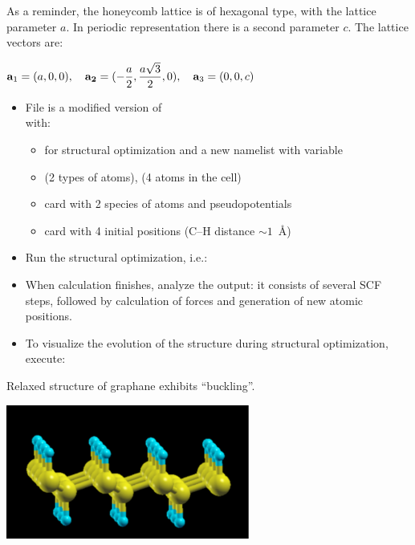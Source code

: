 \documentclass[landscape]{foils}
\begin{document}
As a reminder, the honeycomb lattice is of hexagonal type, with the lattice
parameter $a$. In periodic representation there is a second parameter $c$. The lattice
vectors are:\\
%
\centerline{$\displaystyle
  {\bf a}_1=(a,0,0), \quad {\bf a_2}=(-{a\over 2},{a\sqrt{3}\over 2},0),
  \quad {\bf a}_3=(0,0,c)$}
%

\vspace*{-3mm} %

\begin{itemize}
\item File  is a modified version of\\
   with:
  \begin{itemize}
  \item {} for structural optimization and a
    new namelist  with variable 
  \item {} (2 types of atoms), 
    (4 atoms in the cell)
  \item {} card with 2 species of atoms and
    pseudopotentials
  \item {} card with 4 initial positions
    (C--H distance $\sim 1$~\AA)
  \end{itemize}
\end{itemize}

\begin{itemize}
\item Run the structural optimization, i.e.:\\[0.5em]
\item When calculation finishes, analyze the output: it consists of
   several SCF steps, followed by calculation of forces and generation
   of new atomic positions.
\item To visualize the evolution of the structure during structural
   optimization, execute:\\[1em]
\end{itemize}
\parbox{15cm}{Relaxed structure of graphane exhibits ``buckling''.}
\hskip 0.5cm \parbox{8cm}{
  \includegraphics[width=8cm]{figs/graphane2.pdf}
}
\end{document}
